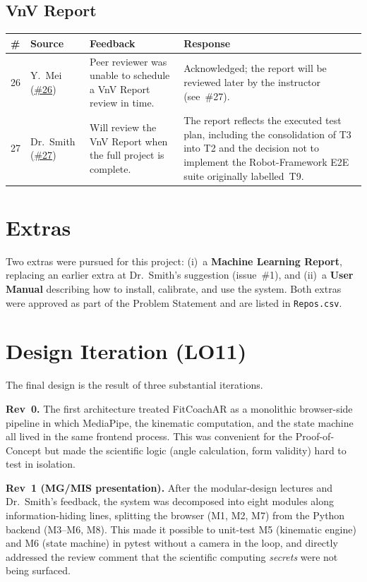 \documentclass{article}
\begin{document}
\subsection{VnV Report}

\begin{longtable}{p{} p{} p{} p{}}
\toprule
\textbf{\#} & \textbf{Source} & \textbf{Feedback} & \textbf{Response}\\
\midrule
\endhead
26 & Y.~Mei (\href{https://github.com/mmdmirh/cas741/issues/26}{\#26}) &
Peer reviewer was unable to schedule a VnV Report review in time. &
Acknowledged; the report will be reviewed later by the instructor
(see~\#27).\\
27 & Dr.~Smith (\href{https://github.com/mmdmirh/cas741/issues/27}{\#27}) &
Will review the VnV Report when the full project is complete. &
The report reflects the executed test plan, including the consolidation of
T3 into T2 and the decision not to implement the Robot-Framework E2E suite
originally labelled~T9.\\
\bottomrule
\end{longtable}

\section{Extras}

Two extras were pursued for this project: (i)~a \textbf{Machine Learning
Report}, replacing an earlier extra at Dr.~Smith's suggestion (issue~\#1), and
(ii)~a \textbf{User Manual} describing how to install, calibrate, and use the
system. Both extras were approved as part of the Problem Statement and are
listed in \texttt{Repos.csv}.

\section{Design Iteration (LO11)}

The final design is the result of three substantial iterations.

\textbf{Rev~0.} The first architecture treated FitCoachAR as a monolithic
browser-side pipeline in which MediaPipe, the kinematic computation, and the
state machine all lived in the same frontend process. This was convenient
for the Proof-of-Concept but made the scientific logic (angle calculation,
form validity) hard to test in isolation.

\textbf{Rev~1 (MG/MIS presentation).} After the modular-design lectures and
Dr.~Smith's feedback, the system was decomposed into eight modules along
information-hiding lines, splitting the browser (M1, M2, M7) from the
Python backend (M3--M6, M8). This made it possible to unit-test M5
(kinematic engine) and M6 (state machine) in pytest without a camera in the
loop, and directly addressed the review comment that the scientific
computing \emph{secrets} were not being surfaced.
\end{document}
